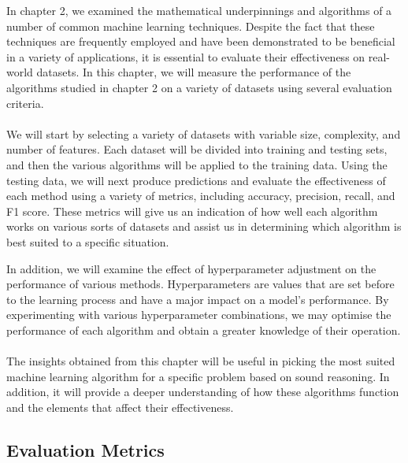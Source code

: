 \documentclass{article}[12pt]
\theoremstyle{definition}
\begin{document}
In chapter 2, we examined the mathematical underpinnings and algorithms of a number of common machine learning techniques. Despite the fact that these techniques are frequently employed and have been demonstrated to be beneficial in a variety of applications, it is essential to evaluate their effectiveness on real-world datasets. In this chapter, we will measure the performance of the algorithms studied in chapter 2 on a variety of datasets using several evaluation criteria. 
\\
\\
We will start by selecting a variety of datasets with variable size, complexity, and number of features. Each dataset will be divided into training and testing sets, and then the various algorithms will be applied to the training data. Using the testing data, we will next produce predictions and evaluate the effectiveness of each method using a variety of metrics, including accuracy, precision, recall, and F1 score. These metrics will give us an indication of how well each algorithm works on various sorts of datasets and assist us in determining which algorithm is best suited to a specific situation. 

\newpage

\noindent
In addition, we will examine the effect of hyperparameter adjustment on the performance of various methods. Hyperparameters are values that are set before to the learning process and have a major impact on a model's performance. By experimenting with various hyperparameter combinations, we may optimise the performance of each algorithm and obtain a greater knowledge of their operation. 
\\
\\
The insights obtained from this chapter will be useful in picking the most suited machine learning algorithm for a specific problem based on sound reasoning. In addition, it will provide a deeper understanding of how these algorithms function and the elements that affect their effectiveness.

\bigskip

\subsection{Evaluation Metrics}

\bigskip
\end{document}
